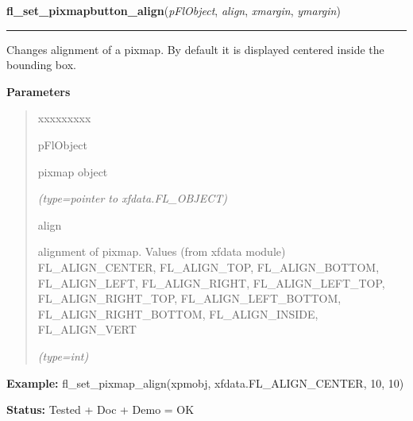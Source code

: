     \vspace{0.5ex}

\hspace{.8\funcindent}\begin{boxedminipage}{\funcwidth}

    \raggedright \textbf{fl\_set\_pixmapbutton\_align}(\textit{pFlObject}, \textit{align}, \textit{xmargin}, \textit{ymargin})

    \vspace{-1.5ex}

    \rule{\textwidth}{0.5\fboxrule}
\setlength{\parskip}{2ex}
    Changes alignment of a pixmap. By default it is displayed centered 
    inside the bounding box.

\setlength{\parskip}{1ex}
      \textbf{Parameters}
      \vspace{-1ex}

      \begin{quote}
        \begin{Ventry}{xxxxxxxxx}

          \item[pFlObject]

          pixmap object

            {\it (type=pointer to xfdata.FL\_OBJECT)}

          \item[align]

          alignment of pixmap. Values (from xfdata module) 
          FL\_ALIGN\_CENTER, FL\_ALIGN\_TOP, FL\_ALIGN\_BOTTOM, 
          FL\_ALIGN\_LEFT, FL\_ALIGN\_RIGHT, FL\_ALIGN\_LEFT\_TOP, 
          FL\_ALIGN\_RIGHT\_TOP, FL\_ALIGN\_LEFT\_BOTTOM, 
          FL\_ALIGN\_RIGHT\_BOTTOM, FL\_ALIGN\_INSIDE, FL\_ALIGN\_VERT

            {\it (type=int)}

        \end{Ventry}

      \end{quote}

\textbf{Example:} fl\_set\_pixmap\_align(xpmobj, xfdata.FL\_ALIGN\_CENTER, 10, 10)



\textbf{Status:} Tested + Doc + Demo = OK



    \end{boxedminipage}

    \label{xformslib:flbitmap:fl_set_pixmap_pixmap}

